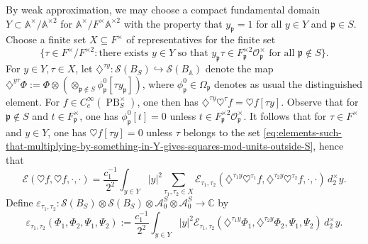 \documentclass[reqno,10pt]{amsart}
\theoremstyle{plain} %
\theoremstyle{definition}
\theoremstyle{plain} %
\theoremstyle{remark}
\theoremstyle{itplain} %
\theoremstyle{remark} %
\numberwithin{equation}{section}
\def\eps{\varepsilon}
\def\PB{\operatorname{PB}}
\begin{document}
By weak approximation, we may choose a compact fundamental domain $Y \subset \mathbb{A}^\times / \mathbb{A}^{\times 2}$ for $\mathbb{A}^\times / F^{\times} \mathbb{A}^{\times 2}$ with the property that $y_\mathfrak{p} = 1$ for all $y \in Y$ and $\mathfrak{p} \in S$.  Choose a finite set $X \subseteq F^\times$ of representatives for the finite set
\begin{equation}\label{eq:elements-such-that-multiplying-by-something-in-Y-gives-squares-mod-units-outside-S}
  \{\tau \in F^\times / F^{\times 2} :
  \text{
    there exists }
  y \in Y
  \text{ so that }
  y_\mathfrak{p} \tau \in F_\mathfrak{p}^{\times 2}  \mathcal{O}_\mathfrak{p}^\times
  \text{ for all }
  \mathfrak{p} \notin S
  \}.
\end{equation}
For $y \in Y, \tau \in X$, let $\diamondsuit^{\tau y} : \mathcal{S}(B_S) \hookrightarrow \mathcal{S}(B_\mathbb{A})$ denote the map $\diamondsuit^{y \tau} \Phi := \Phi \otimes (\otimes_{\mathfrak{p} \notin S} \phi_\mathfrak{p}^0[\tau y_\mathfrak{p} ])$, where $\phi_{\mathfrak{p}}^0 \in \Omega_{\mathfrak{p}}$ denotes as usual the distinguished element.  For $f \in C_c^\infty(\PB_S^\times)$, one then has $\diamondsuit^{\tau y} \heartsuit^{\tau} f = \heartsuit f[\tau y]$.  Observe that for $\mathfrak{p} \notin S$ and $t \in F_\mathfrak{p}^\times$, one has $\phi_\mathfrak{p}^0[t] = 0$ unless $t \in F_\mathfrak{p}^{\times 2} \mathcal{O}_\mathfrak{p}^\times$.  It follows that for $\tau \in F^\times$ and $y \in Y$, one has $\heartsuit f[\tau y] = 0$ unless $\tau$ belongs to the set \eqref{eq:elements-such-that-multiplying-by-something-in-Y-gives-squares-mod-units-outside-S}, hence that
\begin{equation}\label{eq:penultimate-identity-before-proving-main-general-thm}
  \mathcal{E}(\heartsuit f, \heartsuit f, \cdot, \cdot)
  =
  \frac{c_1^{-1}}{2^2}
  \int_{y \in Y}
  |y|^2
  \sum_{\tau_1,\tau_2 \in X}
  \mathcal{E}_{\tau_1,\tau_2}(\diamondsuit^{\tau_1 y}
  \heartsuit^{\tau_1} f,
  \diamondsuit^{\tau_2 y} \heartsuit^{\tau_2} f,
  \cdot,\cdot) \, d_2^\times y.
\end{equation}
Define $\eps_{\tau_1,\tau_2} : \mathcal{S}(B_S) \otimes \mathcal{S}(B_S) \otimes \mathcal{A}_0^S \otimes \mathcal{A}_0^S \rightarrow \mathbb{C}$ by
\begin{equation}\label{eq:defn-of-the-eps-guys-yay}
  \eps_{\tau_1,\tau_2}(\Phi_1,\Phi_2,\Psi_1,\Psi_2)
  :=
  \frac{c_1^{-1}}{2^2}
  \int_{y \in Y}
  |y|^2
  \mathcal{E}_{\tau_1,\tau_2}(\diamondsuit^{\tau_1 y}
  \Phi_1,
  \diamondsuit^{\tau_2 y} \Phi_2,
  \Psi_1,\Psi_2) \, d_2^\times y.
\end{equation}
\end{document}
